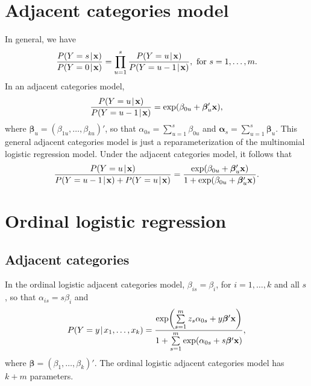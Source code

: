 \documentclass[man,floatmark,12pt]{apa}
\begin{document}
\section{Adjacent categories model}
In general, we have
\begin{equation}
\frac{P(Y=s\!\mid\!\mathbf{x})}{P(Y=0\!\mid\!\mathbf{x})}=\prod_{u=1}^{s}\frac{P(Y=u\!\mid\!\mathbf{x})}{P(Y=u-1\!\mid\!\mathbf{x})},\ \textup{for $s=1,\ldots,m$}.
\end{equation}
In an adjacent categories model,
\begin{equation}
\frac{P(Y=u\!\mid\!\mathbf{x})}{P(Y=u-1\!\mid\!\mathbf{x})}=\textup{exp}(\beta_{0u}+\bm{\beta}_{u}'\mathbf{x}),
\end{equation}
where $\bm{\beta}_{u}=(\beta_{1u},\ldots,\beta_{ku})'$, so that $\alpha_{0s}=\sum_{u=1}^{s}\beta_{0u}$ and $\bm{\alpha}_{s}=\sum_{u=1}^{s}\bm{\beta}_{u}$. This general adjacent categories model is just a reparameterization of the multinomial logistic regression model. Under the adjacent categories model, it follows that
\begin{equation}
\frac{P(Y=u\!\mid\!\mathbf{x})}{P(Y=u-1\!\mid\!\mathbf{x})+P(Y=u\!\mid\!\mathbf{x})}=\frac{\textup{exp}(\beta_{0u}+\bm{\beta}_{u}'\mathbf{x})}{1+\textup{exp}(\beta_{0u}+\bm{\beta}_{u}'\mathbf{x})}.
\end{equation}

\section{Ordinal logistic regression}
\subsection{Adjacent categories}
In the ordinal logistic adjacent categories model, $\beta_{is}=\beta_{i}$, for $i=1,\ldots,k$ and all $s$, so that $\alpha_{is}=s\beta_{i}$ and
\begin{equation}
P(Y=y\!\mid\!x_{1},\dots,x_{k})=\frac{\textup{exp}\!\left(\sum\limits_{s=1}^{m}z_{s}\alpha_{0s}+y\bm{\beta}'\mathbf{x}\right)}{1+\sum\limits_{s=1}^{m}\textup{exp}(\alpha_{0s}+s\bm{\beta}'\mathbf{x})},
\end{equation}
where $\bm{\beta}=(\beta_{1},\ldots,\beta_{k})'$. The ordinal logistic adjacent categories model has $k+m$ parameters.
\end{document}
